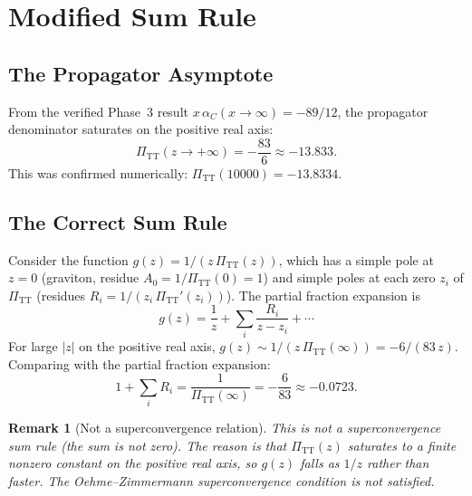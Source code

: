 \documentclass[11pt,a4paper]{article}
\newcommand{\PiTT}{\Pi_{\mathrm{TT}}}
\newtheorem{remark}[theorem]{Remark}
\begin{document}
\section{Modified Sum Rule}
\label{sec:sum-rule}

\subsection{The Propagator Asymptote}

From the verified Phase~3 result $x\,\alpha_C(x \to \infty) = -89/12$,
the propagator denominator saturates on the positive real axis:
\begin{equation}\label{eq:PiTT-inf}
  \PiTT(z \to +\infty) = -\frac{83}{6} \approx -13.833.
\end{equation}
This was confirmed numerically: $\PiTT(10000) = -13.8334$.

\subsection{The Correct Sum Rule}

Consider the function $g(z) = 1/(z\,\PiTT(z))$, which has a simple
pole at $z = 0$ (graviton, residue $A_0 = 1/\PiTT(0) = 1$) and simple
poles at each zero $z_i$ of $\PiTT$ (residues $R_i =
1/(z_i\,\PiTT'(z_i))$).  The partial fraction expansion is
\begin{equation}\label{eq:partial-fraction}
  g(z) = \frac{1}{z} + \sum_i \frac{R_i}{z - z_i} + \cdots
\end{equation}
For large $|z|$ on the positive real axis,
$g(z) \sim 1/(z\,\PiTT(\infty)) = -6/(83\,z)$.  Comparing with
the partial fraction expansion:
\begin{equation}\label{eq:sum-rule}
  \boxed{
  1 + \sum_i R_i = \frac{1}{\PiTT(\infty)} = -\frac{6}{83}
  \approx -0.0723.}
\end{equation}

\begin{remark}[Not a superconvergence relation]
This is \emph{not} a superconvergence sum rule (the sum is not zero).
The reason is that $\PiTT(z)$ saturates to a finite nonzero constant on
the positive real axis, so $g(z)$ falls as $1/z$ rather than faster.
The Oehme--Zimmermann superconvergence condition is not satisfied.
\end{remark}
\end{document}
